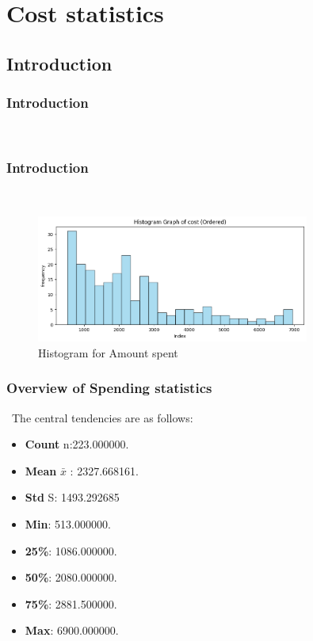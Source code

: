 \documentclass{beamer}
\begin{document}

\section{Cost statistics }
\subsection{Introduction}
\begin{frame}
    \frametitle{Introduction}\
    
\end{frame}

\begin{frame}
    \frametitle{Introduction }\
    \begin{figure}
    \centering
    \includegraphics[width=0.8\textwidth]{Histogram for amount spent.png} %
    \caption{Histogram  for Amount spent } %
    \label{fig:Bar Graph for Costs } %
    \end{figure}
\end{frame}



\begin{frame}
    \frametitle{Overview of Spending statistics}\
    The central tendencies are as follows:
    \begin{block}{}
        \begin{itemize}
            \item \textbf{Count} n:223.000000.
            \item \textbf{Mean} $\bar{x}$ : 2327.668161.
            \item \textbf{Std} S: 1493.292685
            \item \textbf{Min}: 513.000000.
            \item \textbf{25\%}: 1086.000000.
            \item \textbf{50\%}: 2080.000000.
            \item \textbf{75\%}: 2881.500000.
            \item \textbf{Max}: 6900.000000.
        \end{itemize}
    \end{block}
\end{frame}
\end{document}
